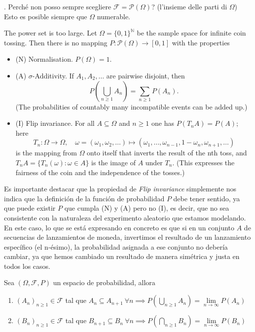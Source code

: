 \noindent
{}. Perché non posso sempre scegliere $\mathcal{F}=\mathcal{P}(\Omega)$? (l'insieme delle parti di $\Omega$) Esto es posible siempre que $\Omega$ numerable.

\begin{teo}[Vitali 1905]
    The power set is too large. Let $\Omega = \{0,1\}^{\mathbb{N}} $ be the sample space for infinite coin tossing. Then there is no mapping $P: \mathcal{P}(\Omega) \to [0,1]$ with the properties
    \begin{itemize}
        \item (N) Normalisation. $P(\Omega) = 1$.
        \item (A) $\sigma$-Additivity. If $A_1, A_2, \ldots$ are pairwise disjoint, then
        $$P\left(\bigcup_{n\geq 1} A_n\right) = \sum_{n\geq 1} P(A_n).$$
        (The probabilities of countably many incompatible events can be added up.)
        \item (I) Flip invariance. For all $A \subseteq \Omega$ and $n \geq 1$ one has $P(T_n A) = P(A)$; here
        $$T_n: \Omega \to \Omega, \quad \omega = (\omega_1, \omega_2, \ldots) \mapsto (\omega_1, \ldots, \omega_{n-1}, 1 - \omega_n, \omega_{n+1}, \ldots)$$
        is the mapping from $\Omega$ onto itself that inverts the result of the nth toss, and \\ $T_n A = \{T_n(\omega) : \omega \in A\}$ is the image of $A$ under $T_n$. (This expresses the fairness of the coin and the independence of the tosses.)
    \end{itemize}
\end{teo}

\noindent
Es importante destacar que la propiedad de \textit{Flip invariance} simplemente nos indica que la definición de la función de probabilidad $P$ debe tener sentido, ya que puede existir $P$ que cumpla (N) y (A) pero no (I), es decir, que no sea consistente con la naturaleza del experimento aleatorio que estamos modelando. En este caso, lo que se está expresando en concreto es que si en un conjunto $A$ de secuencias de lanzamientos de moneda, invertimos el resultado de un lanzamiento específico (el n-ésimo), la probabilidad asignada a ese conjunto no debería cambiar, ya que hemos cambiado un resultado de manera simétrica y justa en todos los casos.


\begin{prop}
    Sea $(\Omega, \mathcal{F}, P)$ un espacio de probabilidad, allora
    \begin{enumerate}[label=\arabic*)]
        \item $(A_n)_{n\geq 1} \in \mathcal{F}$ tal que $A_n\subseteq A_{n+1} \ \forall n  \implies P(\bigcup\limits_{n\geq 1} A_n)=\lim\limits_{n\to \infty} P(A_n)$
        \item $(B_n)_{n\geq 1} \in \mathcal{F}$ tal que $B_{n+1}\subseteq B_n \ \forall n  \implies P(\bigcap\limits_{n\geq 1} B_n)=\lim\limits_{n\to \infty} P(B_n)$
    \end{enumerate}
\end{prop}

